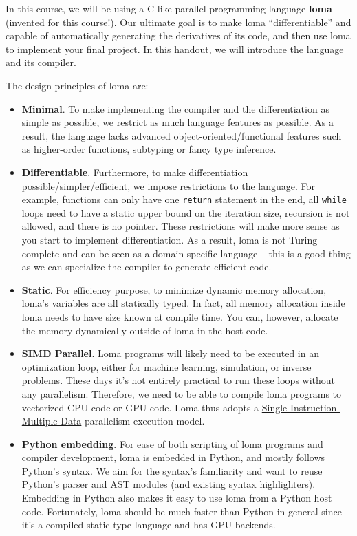 




In this course, we will be using a C-like parallel programming language \textbf{loma} (invented for this course!). Our ultimate goal is to make loma ``differentiable'' and capable of automatically generating the derivatives of its code, and then use loma to implement your final project. In this handout, we will introduce the language and its compiler.

The design principles of loma are:
\begin{itemize}
    \item \textbf{Minimal}. To make implementing the compiler and the differentiation as simple as possible, we restrict as much language features as possible. As a result, the language lacks advanced object-oriented/functional features such as higher-order functions, subtyping or fancy type inference.
    \item \textbf{Differentiable}. Furthermore, to make differentiation possible/simpler/efficient, we impose restrictions to the language. For example, functions can only have one \lstinline{return} statement in the end, all \lstinline{while} loops need to have a static upper bound on the iteration size, recursion is not allowed, and there is no pointer. These restrictions will make more sense as you start to implement differentiation. As a result, loma is not Turing complete and can be seen as a domain-specific language -- this is a good thing as we can specialize the compiler to generate efficient code.
    \item \textbf{Static}. For efficiency purpose, to minimize dynamic memory allocation, loma's variables are all statically typed. In fact, all memory allocation inside loma needs to have size known at compile time. You can, however, allocate the memory dynamically outside of loma in the host code.
    \item \textbf{SIMD Parallel}. Loma programs will likely need to be executed in an optimization loop, either for machine learning, simulation, or inverse problems. These days it's not entirely practical to run these loops without any parallelism. Therefore, we need to be able to compile loma programs to vectorized CPU code or GPU code. Loma thus adopts a \href{https://en.wikipedia.org/wiki/Single_instruction,_multiple_data}{Single-Instruction-Multiple-Data} parallelism execution model.
    \item \textbf{Python embedding}. For ease of both scripting of loma programs and compiler development, loma is embedded in Python, and mostly follows Python's syntax. We aim for the syntax's familiarity and want to reuse Python's parser and AST modules (and existing syntax highlighters). Embedding in Python also makes it easy to use loma from a Python host code. Fortunately, loma should be much faster than Python in general since it's a compiled static type language and has GPU backends.
\end{itemize}

